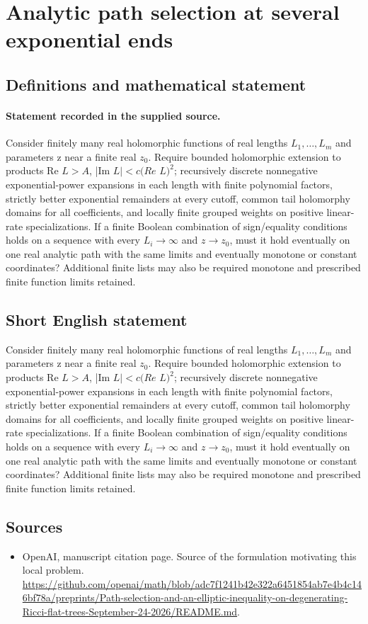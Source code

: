 \documentclass[11pt]{article}
\begin{document}
\section*{Analytic path selection at several exponential ends}\label{30007133}
\subsection{Definitions and mathematical statement}
\paragraph{Statement recorded in the supplied source.}
Consider finitely many real holomorphic functions of real lengths $L_{1},\dots ,L_m$ and parameters z near a finite real $z_{0}$. Require bounded holomorphic extension to products Re $L>A$, |Im $L|<c(Re$ $L)^{2}$; recursively discrete nonnegative exponential-power expansions in each length with finite polynomial factors, strictly better exponential remainders at every cutoff, common tail holomorphy domains for all coefficients, and locally finite grouped weights on positive linear-rate specializations. If a finite Boolean combination of sign/equality conditions holds on a sequence with every $L_i\to \infty $ and $z\to z_{0}$, must it hold eventually on one real analytic path with the same limits and eventually monotone or constant coordinates? Additional finite lists may also be required monotone and prescribed finite function limits retained.
\subsection{Short English statement}
Consider finitely many real holomorphic functions of real lengths $L_{1},\dots ,L_m$ and parameters z near a finite real $z_{0}$. Require bounded holomorphic extension to products Re $L>A$, |Im $L|<c(Re$ $L)^{2}$; recursively discrete nonnegative exponential-power expansions in each length with finite polynomial factors, strictly better exponential remainders at every cutoff, common tail holomorphy domains for all coefficients, and locally finite grouped weights on positive linear-rate specializations. If a finite Boolean combination of sign/equality conditions holds on a sequence with every $L_i\to \infty $ and $z\to z_{0}$, must it hold eventually on one real analytic path with the same limits and eventually monotone or constant coordinates? Additional finite lists may also be required monotone and prescribed finite function limits retained.
\subsection{Sources}
\begin{itemize}
\item[S1] OpenAI, manuscript citation page. Source of the formulation motivating this local problem.
\url{https://github.com/openai/math/blob/adc7f1241b42e322a6451854ab7e4b4c146bf78a/preprints/Path-selection-and-an-elliptic-inequality-on-degenerating-Ricci-flat-trees-September-24-2026/README.md}.
\end{itemize}
\end{document}
